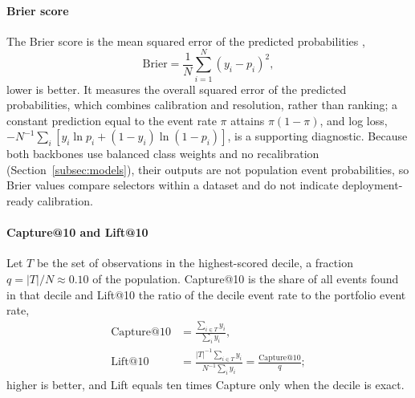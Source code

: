 \documentclass[final,5p,twocolumn]{elsarticle}
\begin{document}
\paragraph{Brier score}
The Brier score is the mean squared error of the predicted probabilities \cite{brier1950},
\begin{equation}
    \mathrm{Brier}=\frac{1}{N}\sum_{i=1}^{N}(y_i-p_i)^2 ,
    \label{eq:brier}
\end{equation}
lower is better. It measures the overall squared error of the predicted probabilities, which combines calibration and resolution, rather than ranking; a constant prediction equal to the event rate $\pi$ attains $\pi(1-\pi)$, and log loss, $-N^{-1}\sum_i[y_i\ln p_i+(1-y_i)\ln(1-p_i)]$, is a supporting diagnostic. Because both backbones use balanced class weights and no recalibration (Section~\ref{subsec:models}), their outputs are not population event probabilities, so Brier values compare selectors within a dataset and do not indicate deployment-ready calibration.

\paragraph{Capture@10 and Lift@10}
Let $T$ be the set of observations in the highest-scored decile, a fraction $q=|T|/N\approx0.10$ of the population. Capture@10 is the share of all events found in that decile and Lift@10 the ratio of the decile event rate to the portfolio event rate,
\begin{equation}
\begin{aligned}
    \mathrm{Capture@10}&=\frac{\sum_{i\in T}y_i}{\sum_{i}y_i},\\
    \mathrm{Lift@10}&=\frac{|T|^{-1}\sum_{i\in T}y_i}{N^{-1}\sum_{i}y_i}=\frac{\mathrm{Capture@10}}{q};
\end{aligned}
    \label{eq:capture10}
\end{equation}
higher is better, and Lift equals ten times Capture only when the decile is exact.
\end{document}
